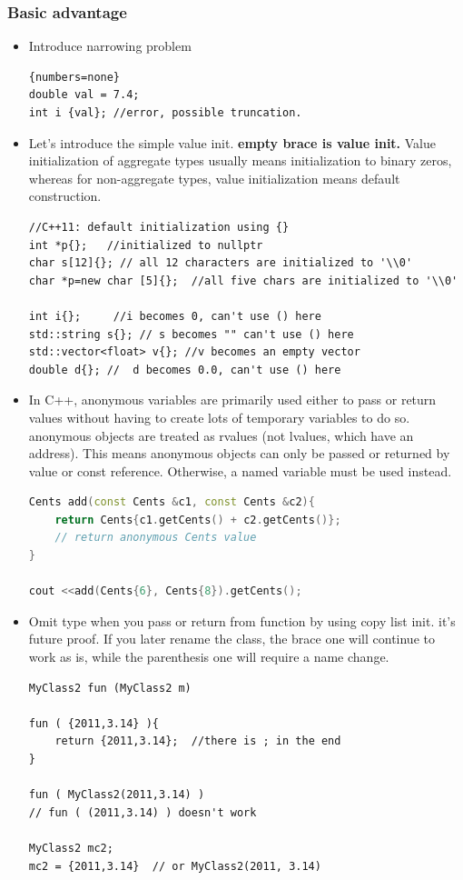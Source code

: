 \documentclass[a4paper,11pt,twoside]{book}
\begin{document}
\subsubsection{Basic advantage}
\begin{itemize}
\item Introduce narrowing problem
\begin{lstlisting}{numbers=none}
double val = 7.4;
int i {val}; //error, possible truncation.
\end{lstlisting}


\item Let's introduce the simple value init. \textbf{empty brace is value init.} Value initialization of aggregate types usually means initialization to binary zeros, whereas for non-aggregate types, value initialization means default construction.
\begin{lstlisting}[numbers = none]
//C++11: default initialization using {}
int *p{};   //initialized to nullptr
char s[12]{}; // all 12 characters are initialized to '\\0'
char *p=new char [5]{};  //all five chars are initialized to '\\0'

int i{};     //i becomes 0, can't use () here         
std::string s{}; // s becomes "" can't use () here  
std::vector<float> v{}; //v becomes an empty vector
double d{}; //  d becomes 0.0, can't use () here        
\end{lstlisting}




\item In C++, anonymous variables are primarily used either to pass or return values without having to create lots of temporary variables to do so. anonymous objects are treated as rvalues (not lvalues, which have an address). This means anonymous objects can only be passed or returned by value or const reference. Otherwise, a named variable must be used instead.

\begin{lstlisting}[frame=single, language=c++]
Cents add(const Cents &c1, const Cents &c2){
	return Cents{c1.getCents() + c2.getCents()};
	// return anonymous Cents value
}

cout <<add(Cents{6}, Cents{8}).getCents();
\end{lstlisting}

\item Omit type when you pass or return from function by using copy list init. it's future proof. If you later rename the class, the brace one will continue to work as is, while the parenthesis one will require a name change.

\begin{lstlisting}
MyClass2 fun (MyClass2 m) 

fun ( {2011,3.14} ){
	return {2011,3.14};  //there is ; in the end
}

fun ( MyClass2(2011,3.14) ) 
// fun ( (2011,3.14) ) doesn't work

MyClass2 mc2;
mc2 = {2011,3.14}  // or MyClass2(2011, 3.14)
\end{lstlisting}


\end{itemize}
\end{document}
